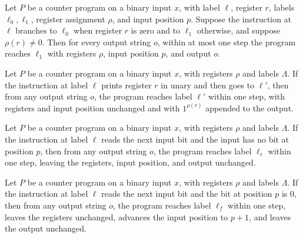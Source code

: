 \begin{theorem}
\label{Complexity.CounterProg.goes_jz_pos}
\leanok
{}
Let $P$ be a counter program on a binary input $x$, with label $\ell$, register $r$,
labels $\ell_0,\ell_1$, register assignment $\rho$, and input position $p$. Suppose the
instruction at $\ell$ branches to $\ell_0$ when register $r$ is zero and to $\ell_1$
otherwise, and suppose $\rho(r)\ne 0$. Then for every output string $o$, within at most
one step the program reaches $\ell_1$ with registers $\rho$, input position $p$, and
output $o$.
\end{theorem}

\begin{theorem}
\label{Complexity.CounterProg.goes_pr}
\leanok
{}
Let $P$ be a counter program on a binary input $x$, with registers $\rho$ and labels
$\Lambda$. If the instruction at label $\ell$ prints register $r$ in unary and then goes
to $\ell'$, then from any output string $o$, the program reaches label $\ell'$ within
one step, with registers and input position unchanged and with $1^{\rho(r)}$ appended to
the output.
\end{theorem}

\begin{theorem}
\label{Complexity.CounterProg.goes_rd_end}
\leanok
{}
Let $P$ be a counter program on a binary input $x$, with registers $\rho$ and labels
$\Lambda$. If the instruction at label $\ell$ reads the next input bit and the input has
no bit at position $p$, then from any output string $o$, the program reaches label
$\ell_e$ within one step, leaving the registers, input position, and output unchanged.
\end{theorem}

\begin{theorem}
\label{Complexity.CounterProg.goes_rd_false}
\leanok
{}
Let $P$ be a counter program on a binary input $x$, with registers $\rho$ and labels
$\Lambda$. If the instruction at label $\ell$ reads the next input bit and the bit at
position $p$ is $0$, then from any output string $o$, the program reaches label $\ell_f$
within one step, leaves the registers unchanged, advances the input position to $p+1$,
and leaves the output unchanged.
\end{theorem}

